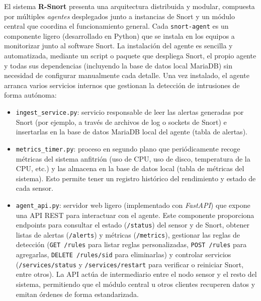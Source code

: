 \documentclass[11pt,a4paper,twoside]{report}
\begin{document}
El sistema \textbf{R-Snort} presenta una arquitectura distribuida y modular, compuesta por múltiples \emph{agentes} desplegados junto a instancias de Snort y un módulo central que coordina el funcionamiento general.\newline
Cada \texttt{snort-agent} es un componente ligero (desarrollado en Python) que se instala en los equipos a monitorizar junto al software Snort. La instalación del agente es sencilla y automatizada, mediante un script o paquete que despliega Snort, el propio agente y todas sus dependencias (incluyendo la base de datos local MariaDB) sin necesidad de configurar manualmente cada detalle. Una vez instalado, el agente arranca varios servicios internos que gestionan la detección de intrusiones de forma autónoma:\newline
\begin{itemize}
	\item \texttt{ingest\_service.py}: servicio responsable de leer las alertas generadas por Snort (por ejemplo, a través de archivos de log o sockets de Snort) e insertarlas en la base de datos MariaDB local del agente (tabla de alertas).
	\item \texttt{metrics\_timer.py}: proceso en segundo plano que periódicamente recoge métricas del sistema anfitrión (uso de CPU, uso de disco, temperatura de la CPU, etc.) y las almacena en la base de datos local (tabla de métricas del sistema). Esto permite tener un registro histórico del rendimiento y estado de cada sensor.
	\item \texttt{agent\_api.py}: servidor web ligero (implementado con \textit{FastAPI}) que expone una API REST para interactuar con el agente. Este componente proporciona endpoints para consultar el estado (\texttt{/status}) del sensor y de Snort, obtener listas de alertas (\texttt{/alerts}) y métricas (\texttt{/metrics}), gestionar las reglas de detección (\texttt{GET /rules} para listar reglas personalizadas, \texttt{POST /rules} para agregarlas, \texttt{DELETE /rules/{sid}} para eliminarlas) y controlar servicios (\texttt{/services/status} y \texttt{/services/restart} para verificar o reiniciar Snort, entre otros). La API actúa de intermediario entre el nodo sensor y el resto del sistema, permitiendo que el módulo central u otros clientes recuperen datos y emitan órdenes de forma estandarizada.
\end{itemize}
\end{document}

